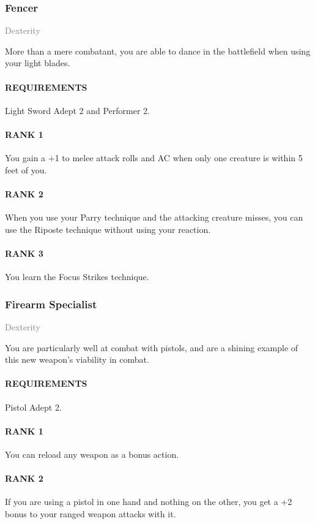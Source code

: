 \subsubsection{Fencer} \label{feat::fencer}
\small{\textcolor{gray}{Dexterity}}

\normalsize
More than a mere combatant, you are able to dance in the battlefield when using your light blades.
\paragraph{REQUIREMENTS} Light Sword Adept 2 and Performer 2.
\paragraph{RANK 1} You gain a +1 to melee attack rolls and AC when only one creature is within 5 feet of you.
\paragraph{RANK 2} When you use your Parry technique and the attacking creature misses, you can use the Riposte technique without using your reaction.
\paragraph{RANK 3} You learn the Focus Strikes technique.

\subsubsection{Firearm Specialist} \label{feat::firearmspecialist}
\small{\textcolor{gray}{Dexterity}}

\normalsize
You are particularly well at combat with pistols, and are a shining example of this new weapon's viability in combat.
\paragraph{REQUIREMENTS} Pistol Adept 2.
\paragraph{RANK 1} You can reload any weapon as a bonus action.
\paragraph{RANK 2} If you are using a pistol in one hand and nothing on the other, you get a +2 bonus to your ranged weapon attacks with it.
